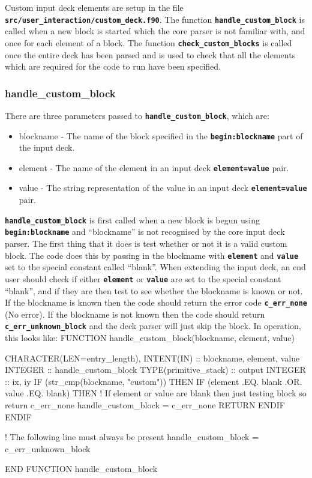 \documentclass[12pt,a4paper]{article}
\newcommand{\inlinecode}[1]{{\color{warwickred} \bf\texttt{#1}}}
\newenvironment{boxverbatim}{\lboxverbatim{none}}{\endlboxverbatim}
\begin{document}
Custom input deck elements are setup in the file
\inlinecode{src/user\_interaction/custom\_deck.f90}. The function
\inlinecode{handle\_custom\_block} is called when a new block is started which
the core parser is not familiar with, and once for each element of a block. The
function \inlinecode{check\_custom\_blocks} is called once the entire deck has
been parsed and is used to check that all the elements which are required for
the code to run have been specified.

\subsubsection{handle\_custom\_block}
There are three parameters passed to \inlinecode{handle\_custom\_block}, which
are:
\begin{itemize}
\item blockname - The name of the block specified in the
  \inlinecode{begin:blockname} part of the input deck.
\item element - The name of the element in an input deck
  \inlinecode{element=value} pair.
\item value - The string representation of the value in an input deck
  \inlinecode{element=value} pair.
\end{itemize}

\inlinecode{handle\_custom\_block} is first called when a new block is begun
using \inlinecode{begin:blockname} and ``blockname'' is not recognised by the
core input deck parser. The first thing that it does is test whether or not it
is a valid custom block. The code does this by passing in the blockname with
\inlinecode{element} and \inlinecode{value} set to the special constant called
``blank''. When extending the input deck, an end user should check if either
\inlinecode{element} or \inlinecode{value} are set to the special constant
``blank'', and if they are then test to see whether the blockname is known or
not. If the blockname is known then the code should return the error code
\inlinecode{c\_err\_none} (No error). If the blockname is not known then the
code should return \inlinecode{c\_err\_unknown\_block} and the deck parser will
just skip the block. In operation, this looks like:
\begin{boxverbatim}
FUNCTION handle_custom_block(blockname, element, value)

  CHARACTER(LEN=entry_length), INTENT(IN) :: blockname, element, value
  INTEGER :: handle_custom_block
  TYPE(primitive_stack) :: output
  INTEGER :: ix, iy
  IF (str_cmp(blockname, "custom")) THEN
    IF (element .EQ. blank .OR. value .EQ. blank) THEN
       ! If element or value are blank then just testing block so return c_err_none
       handle_custom_block = c_err_none
       RETURN
     ENDIF
   ENDIF

  ! The following line must always be present
  handle_custom_block = c_err_unknown_block

END FUNCTION handle_custom_block
\end{boxverbatim}
\end{document}
